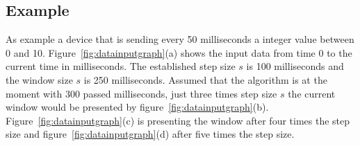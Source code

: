 \documentclass[runningheads,a4paper]{llncs}
\begin{document}
    \subsection{Example}
    As example a device that is sending every 50 milliseconds a integer value between 0 and 10.
    Figure~\ref{fig:datainputgraph}(a) shows the input data from time 0 to the current time in milliseconds. The
    established step size $s$ is 100 milliseconds and the window size $s$ is 250 milliseconds. Assumed that the
    algorithm is at the moment with 300 passed milliseconds, just three times step size $s$ the current window would be
    presented by figure~\ref{fig:datainputgraph}(b). Figure~\ref{fig:datainputgraph}(c) is presenting the window after
    four times the step size and figure~\ref{fig:datainputgraph}(d) after five times the step size.\\
\end{document}
